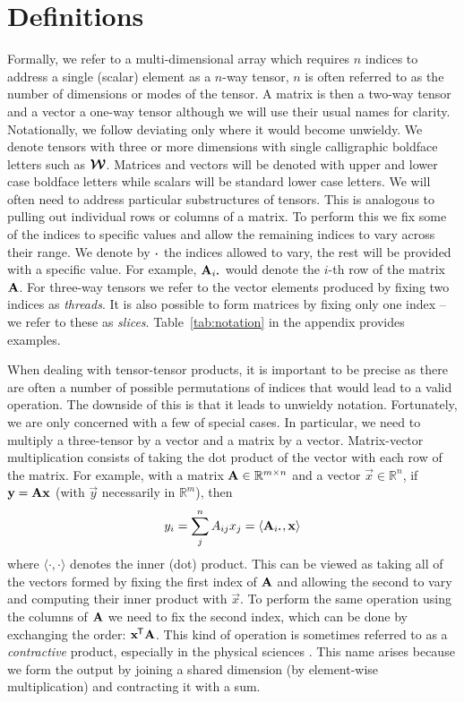 \section{Definitions}
Formally, we refer to a multi-dimensional array which requires \(n\) indices to address a single
(scalar) element as a \(n\)-way tensor, \(n\) is often referred to as the number of dimensions or modes
of the tensor. A matrix is then a two-way tensor and a vector
a one-way tensor although we will use their usual names for clarity. Notationally, we follow
\autocite{Kolda2009} deviating only where it would become unwieldy.
We denote tensors with three or more dimensions with single calligraphic boldface letters such
as \(\bm{\mathcal{W}}\). Matrices and vectors will be denoted with upper and lower case boldface letters
while scalars will be standard lower case letters. We will often need to address particular
substructures of tensors. This is analogous to pulling out individual rows or columns of a matrix.
To perform this we fix some of the indices to specific values and allow the remaining indices to vary
across their range. We denote by \(\midbullet\) the indices allowed to vary, the rest will be provided
with a specific value. For example, \(\mat{A}_{i \midbullet}\) would denote the \(i\)-th row of the
matrix \(\mathbf{A}\).
For three-way tensors we refer to the vector elements produced by fixing two indices as 
\emph{threads}. It is also possible to form matrices by fixing only one index -- we refer to these
as \emph{slices}. Table~\ref{tab:notation} in the appendix provides examples.


When dealing with tensor-tensor products, it is important to be precise as there are often
a number of possible permutations of indices that would lead to a valid operation. The downside of
this is that it leads to unwieldy notation. Fortunately, we are only concerned with a few of
special cases. In particular, we need to multiply a three-tensor by a vector and a matrix by a
vector. Matrix-vector multiplication consists of taking the dot product of the vector with
each row of the matrix. For example, with a matrix \(\mathbf{A} \in \mathbb{R}^{m \times n}\) and a
vector \(\vec{x} \in \mathbb{R}^n\), if \(\mathbf{y} = \mathbf{A}\mathbf{x}\) (with \(\vec{y}\) necessarily
in \(\mathbb{R}^m\)), then
\begin{equation}\label{eq:matmul}
	y_i = \sum_j^n A_{ij} x_j
		= \langle \vec{A}_{i \midbullet}, \vec{x}\rangle
\end{equation} where \(\langle \cdot, \cdot \rangle\) denotes the inner (dot) product. This can be viewed
as taking all of the vectors formed by fixing the first index of \(\mathbf{A}\) and allowing the second
to vary and computing their inner product with \(\vec{x}\). To perform the same operation using the
columns of \(\mathbf{A}\) we need to fix the second index, which can be done by exchanging the
order: \(\mathbf{x}^{\mkern-1.5mu\mathsf{T}}\mathbf{A}\). This kind of operation is sometimes referred to as a
\emph{contractive} product, especially in the physical sciences \autocite{Orus2014}. This name
arises because we form the output by joining a shared dimension (by element-wise multiplication) and
contracting it with a sum.


